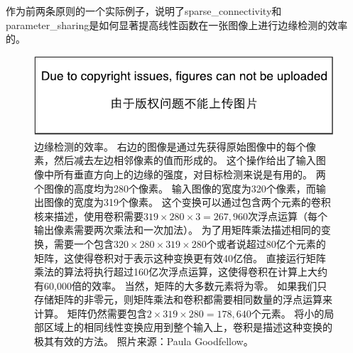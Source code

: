作为前两条原则的一个实际例子，说明了\gls{sparse_connectivity}和\gls{parameter_sharing}是如何显著提高线性函数在一张图像上进行边缘检测的效率的。
\begin{figure}
\ifOpenSource
\centerline{\includegraphics{figure.pdf}}
\else
\centering    
{}     
\fi
\captionsetup{singlelinecheck=off}
\caption{边缘检测的效率。
右边的图像是通过先获得原始图像中的每个像素，然后减去左边相邻像素的值而形成的。
这个操作给出了输入图像中所有垂直方向上的边缘的强度，对目标检测来说是有用的。
两个图像的高度均为280个像素。
输入图像的宽度为320个像素，而输出图像的宽度为319个像素。
这个变换可以通过包含两个元素的卷积核来描述，使用卷积需要$319\times 280\times 3 = 267,960$次浮点运算（每个输出像素需要两次乘法和一次加法）。
为了用矩阵乘法描述相同的变换，需要一个包含$320\times 280\times 319\times 280$个或者说超过80亿个元素的矩阵，这使得卷积对于表示这种变换更有效40亿倍。
直接运行矩阵乘法的算法将执行超过160亿次浮点运算，这使得卷积在计算上大约有60,000倍的效率。
当然，矩阵的大多数元素将为零。
如果我们只存储矩阵的非零元，则矩阵乘法和卷积都需要相同数量的浮点运算来计算。
矩阵仍然需要包含$2\times 319\times 280=178,640$个元素。
将小的局部区域上的相同线性变换应用到整个输入上，卷积是描述这种变换的极其有效的方法。
照片来源：Paula Goodfellow。}   
\label{fig:chap9_efficiency_of_edge_detection}     
\end{figure}
 
